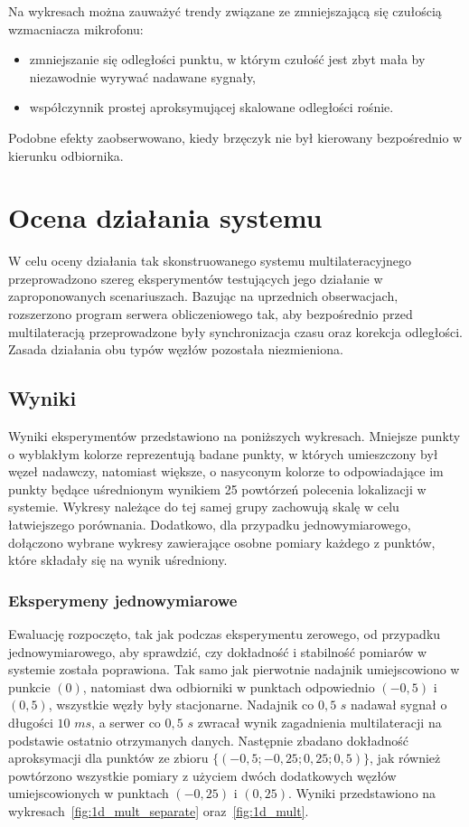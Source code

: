 Na wykresach można zauważyć trendy związane ze zmniejszającą się czułością wzmacniacza mikrofonu:

\begin{itemize}
    \item zmniejszanie się odległości punktu, w którym czułość jest zbyt mała by niezawodnie wyrywać nadawane sygnały,
    \item współczynnik prostej aproksymującej skalowane odległości rośnie.
\end{itemize}

Podobne efekty zaobserwowano, kiedy brzęczyk nie był kierowany bezpośrednio w kierunku odbiornika.

\section{Ocena działania systemu}

W celu oceny działania tak skonstruowanego systemu multilateracyjnego przeprowadzono szereg eksperymentów testujących jego działanie   w zaproponowanych scenariuszach. Bazując na uprzednich obserwacjach, rozszerzono program serwera obliczeniowego tak, aby bezpośrednio przed multilateracją przeprowadzone były synchronizacja czasu oraz korekcja odległości. Zasada działania obu typów węzłów pozostała niezmieniona.

\subsection{Wyniki}

Wyniki eksperymentów przedstawiono na  poniższych wykresach. Mniejsze punkty o wyblakłym kolorze reprezentują badane punkty, w których umieszczony był węzeł nadawczy, natomiast większe, o nasyconym kolorze to odpowiadające im punkty będące uśrednionym wynikiem 25 powtórzeń polecenia lokalizacji w systemie. Wykresy należące do tej samej grupy zachowują skalę w celu łatwiejszego porównania. Dodatkowo, dla przypadku jednowymiarowego, dołączono wybrane wykresy zawierające osobne pomiary każdego z punktów, które składały się na wynik uśredniony.

\subsubsection{Eksperymeny jednowymiarowe}\label{sec:1d}

Ewaluację rozpoczęto, tak jak podczas eksperymentu zerowego, od przypadku jednowymiarowego, aby sprawdzić, czy dokładność i stabilność pomiarów w systemie została poprawiona. Tak samo jak pierwotnie nadajnik umiejscowiono w punkcie $(0)$, natomiast dwa odbiorniki w punktach odpowiednio $(-0,5)$ i $(0,5)$, wszystkie węzły były stacjonarne. Nadajnik co $0,5$ $s$ nadawał sygnał o długości $10$ $ms$, a serwer co $0,5$ $s$ zwracał wynik zagadnienia multilateracji na podstawie ostatnio otrzymanych danych. Następnie zbadano dokładność aproksymacji dla punktów ze zbioru $\{(-0,5; -0,25; 0,25; 0,5)\}$, jak również powtórzono wszystkie pomiary z użyciem dwóch dodatkowych węzłów umiejscowionych w punktach $(-0,25)$ i $(0,25)$. Wyniki przedstawiono na wykresach~\ref{fig:1d_mult_separate} oraz~\ref{fig:1d_mult}.

